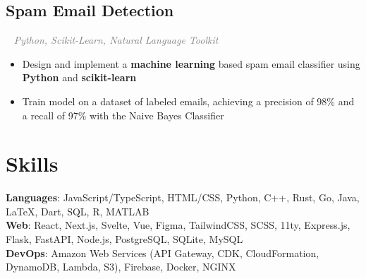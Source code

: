 \documentclass{article}
\newcommand{\resumesection}[3]{
    \subsection*{#1}
    \ 
    \normalsize
    \normalsize
    \hfill
    \textcolor{black}{#3}
    \normalsize
    \newline
    \small
    \textcolor{grey}{\emph{#2}}
}
\newcommand{\projectsection}[3]{
    \subsection*{#1}
    \ 
    \small
    \textcolor{grey}{\emph{#2}}
    \normalsize
    \hfill
    \textcolor{black}{#3}
    \small
}
\begin{document}
\projectsection{Spam Email Detection}{Python, Scikit-Learn, Natural Language Toolkit}{}
\begin{itemize}
    \item Design and implement a \textbf{machine learning} based spam email classifier using \textbf{Python} and \textbf{scikit-learn}
    \item Train model on a dataset of labeled emails, achieving a precision of 98\% and a recall of 97\% with the Naive Bayes Classifier
\end{itemize}



\section*{Skills}
\textbf{Languages}: JavaScript/TypeScript, HTML/CSS, Python, C++, Rust, Go, Java, {\selectfont\LaTeX}, Dart, SQL, R, MATLAB\\
\textbf{Web}: React, Next.js, Svelte, Vue, Figma, TailwindCSS, SCSS, 11ty, Express.js, Flask, FastAPI, Node.js, PostgreSQL, SQLite, MySQL\\
\textbf{DevOps}: Amazon Web Services (API Gateway, CDK, CloudFormation, DynamoDB, Lambda, S3), Firebase, Docker, NGINX\\
\end{document}

